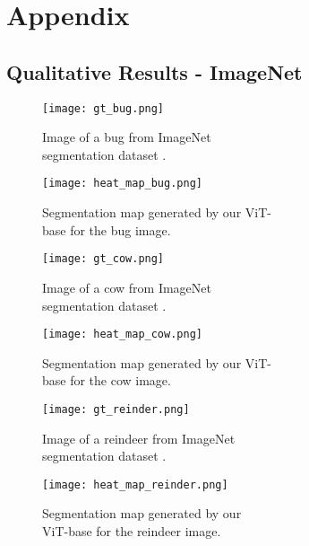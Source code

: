 \newpage
\section*{Appendix}

\subsection*{Qualitative Results - ImageNet}
\label{ImageNet_results}

\begin{figure}[H]
  \texttt{[image: gt\_bug.png]}
  \caption{Image of a bug from ImageNet \\segmentation dataset \cite{imagenet-seg}.}\label{fig:gt_bug}
\endminipage\hfill
{}
  \texttt{[image: heat\_map\_bug.png]}
  \caption{Segmentation map generated by our ViT- \\base for the bug image.}\label{fig:map_bug}
\endminipage\hfill
\end{figure}

\begin{figure}[H]
  \texttt{[image: gt\_cow.png]}
  \caption{Image of a cow from ImageNet \\segmentation dataset \cite{imagenet-seg}.}\label{fig:gt_cow}
\endminipage\hfill
{}
  \texttt{[image: heat\_map\_cow.png]}
  \caption{Segmentation map generated by our ViT- \\base for the cow image.}\label{fig:map_cow}
\endminipage\hfill
\end{figure}


\begin{figure}[H]
  \texttt{[image: gt\_reinder.png]}
  \caption{Image of a reindeer from ImageNet \\segmentation dataset \cite{imagenet-seg}.}\label{fig:gt_reinder}
\endminipage\hfill
{}
  \texttt{[image: heat\_map\_reinder.png]}
  \caption{Segmentation map generated by our \\ViT-base for the reindeer image.}\label{fig:map_reinder}
\endminipage\hfill
\end{figure}

